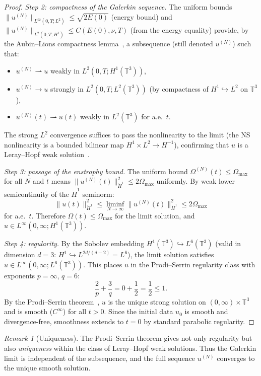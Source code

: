 \documentclass[11pt,a4paper]{article}
\theoremstyle{remark}
\newtheorem{remark}[theorem]{Remark}
\newcommand{\T}{\mathbb{T}}
\begin{document}
\begin{proof}
\medskip
\emph{Step 2: compactness of the Galerkin sequence.}
The uniform bounds $\|u^{(N)}\|_{L^\infty(0,T; L^2)} \leq \sqrt{2E(0)}$ (energy bound) and $\|u^{(N)}\|_{L^2(0,T; H^1)} \leq C(E(0), \nu, T)$ (from the energy equality) provide, by the Aubin--Lions compactness lemma~\cite{lions1969}, a subsequence (still denoted $u^{(N)}$) such that:
\begin{itemize}
\item $u^{(N)} \rightharpoonup u$ weakly in $L^2(0,T; H^1(\T^3))$,
\item $u^{(N)} \to u$ strongly in $L^2(0,T; L^2(\T^3))$ (by compactness of $H^1 \hookrightarrow L^2$ on $\T^3$),
\item $u^{(N)}(t) \rightharpoonup u(t)$ weakly in $L^2(\T^3)$ for a.e.\ $t$.
\end{itemize}
The strong $L^2$ convergence suffices to pass the nonlinearity to the limit (the NS nonlinearity is a bounded bilinear map $H^1 \times L^2 \to H^{-1}$), confirming that $u$ is a Leray--Hopf weak solution~\cite{leray1934,temam1977}.

\medskip
\emph{Step 3: passage of the enstrophy bound.}
The uniform bound $\Omega^{(N)}(t) \leq \Omega_{\max}$ for all $N$ and $t$ means $\|u^{(N)}(t)\|_{\dot{H}^1}^2 \leq 2\Omega_{\max}$ uniformly.  By weak lower semicontinuity of the $\dot{H}^1$ seminorm:
\[
  \|u(t)\|_{\dot{H}^1}^2 \leq \liminf_{N \to \infty} \|u^{(N)}(t)\|_{\dot{H}^1}^2 \leq 2\Omega_{\max}
\]
for a.e.\ $t$.  Therefore $\Omega(t) \leq \Omega_{\max}$ for the limit solution, and $u \in L^\infty(0,\infty; H^1(\T^3))$.

\medskip
\emph{Step 4: regularity.}
By the Sobolev embedding $H^1(\T^3) \hookrightarrow L^6(\T^3)$ (valid in dimension $d = 3$: $H^1 \hookrightarrow L^{2d/(d-2)} = L^6$), the limit solution satisfies $u \in L^\infty(0,\infty; L^6(\T^3))$.  This places $u$ in the Prodi--Serrin regularity class with exponents $p = \infty$, $q = 6$:
\[
  \frac{2}{p} + \frac{3}{q} = 0 + \frac{1}{2} = \frac{1}{2} \leq 1.
\]
By the Prodi--Serrin theorem~\cite{prodi1959,serrin1962}, $u$ is the unique strong solution on $(0,\infty) \times \T^3$ and is smooth ($C^\infty$) for all $t > 0$.  Since the initial data $u_0$ is smooth and divergence-free, smoothness extends to $t = 0$ by standard parabolic regularity.
\end{proof}

\begin{remark}[Uniqueness]
The Prodi--Serrin theorem gives not only regularity but also \emph{uniqueness} within the class of Leray--Hopf weak solutions.  Thus the Galerkin limit is independent of the subsequence, and the full sequence $u^{(N)}$ converges to the unique smooth solution.
\end{remark}
\end{document}
